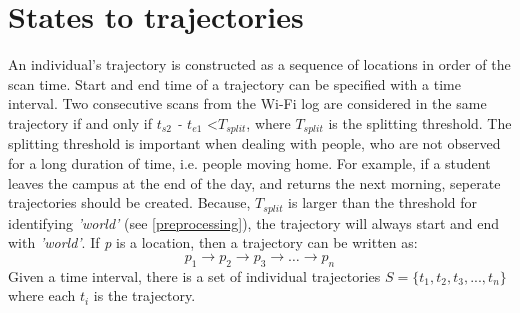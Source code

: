 \section{States to trajectories}\label{statesToTrajectories}
An individual’s trajectory is constructed as a sequence of locations in order of the scan time. Start and end time of a trajectory can be specified with a time interval. Two consecutive scans from the Wi-Fi log are considered in the same trajectory if and only if \textit{$t_{s2}$ - $t_{e1}$} \textless \textit{$T_{split}$}, where \textit{$T_{split}$} is the splitting threshold. The splitting threshold is important when dealing with people, who are not observed for a long duration of time, i.e. people moving home. For example, if a student leaves the campus at the end of the day, and returns the next morning, seperate trajectories should be created. Because, \textit{$T_{split}$} is larger than the threshold for identifying \textit{'world'} (see \autoref{preprocessing}), the trajectory will always start and end with \textit{'world'}. If \textit{p} is a location, then a trajectory can be written as:
$$p_{1} \rightarrow p_{2} \rightarrow p_{3} \rightarrow … \rightarrow p_{n}$$
Given a time interval, there is a set of individual trajectories $\textit{S} = \{t_{1}, t_{2}, t_{3},...,t_{n}\}$ where each $t_{i}$ is the trajectory.
